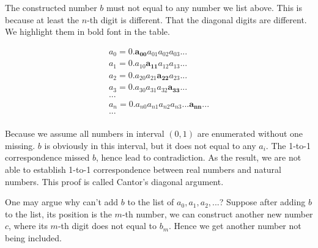 \documentclass{article}
\begin{document}
The constructed number $b$ must not equal to any number we list above. This is because at least the $n$-th digit is different. That the diagonal digits are different. We highlight them in bold font in the table.

\[
\begin{array}{l}
a_0 = 0.\pmb{a_{00}}a_{01}a_{02}a_{03}...\\
a_1 = 0.a_{10}\pmb{a_{11}}a_{12}a_{13}...\\
a_2 = 0.a_{20}a_{21}\pmb{a_{22}}a_{23}...\\
a_3 = 0.a_{30}a_{31}a_{32}\pmb{a_{33}}...\\
... \\
a_n = 0.a_{n0}a_{n1}a_{n2}a_{n3}...\pmb{a_{nn}}...\\
... \\
\end{array}
\]

Because we assume all numbers in interval $(0, 1)$ are enumerated without one missing. $b$ is obviously in this interval, but it does not equal to any $a_i$. The 1-to-1 correspondence missed $b$, hence lead to contradiction. As the result, we are not able to establish 1-to-1 correspondence between real numbers and natural numbers. This proof is called Cantor's diagonal argument.

One may argue why can't add $b$ to the list of $a_0, a_1, a_2, ...$? Suppose after adding $b$ to the list, its position is the $m$-th number, we can construct another new number $c$, where its $m$-th digit does not equal to $b_m$. Hence we get another number not being included.
\end{document}
